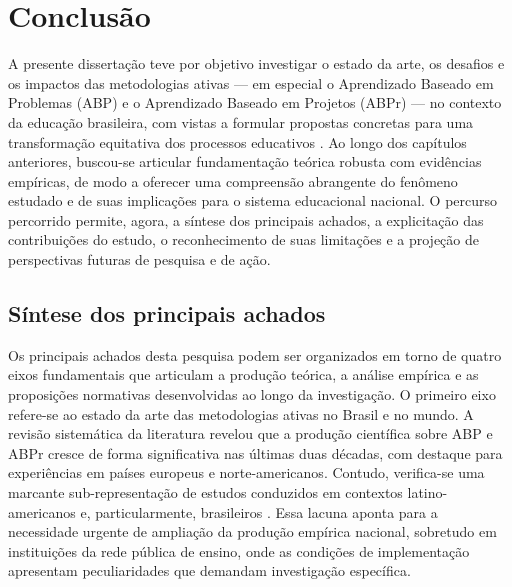
\chapter{Conclusão}
\label{chap:conclusao}

A presente dissertação teve por objetivo investigar o estado da arte, os desafios e os impactos das metodologias ativas — em especial o Aprendizado Baseado em Problemas (ABP) e o Aprendizado Baseado em Projetos (ABPr) — no contexto da educação brasileira, com vistas a formular propostas concretas para uma transformação equitativa dos processos educativos \cite{BACICH2018}. Ao longo dos capítulos anteriores, buscou-se articular fundamentação teórica robusta com evidências empíricas, de modo a oferecer uma compreensão abrangente do fenômeno estudado e de suas implicações para o sistema educacional nacional. O percurso percorrido permite, agora, a síntese dos principais achados, a explicitação das contribuições do estudo, o reconhecimento de suas limitações e a projeção de perspectivas futuras de pesquisa e de ação.

\section{Síntese dos principais achados}
\label{sec:sintese_achados}

Os principais achados desta pesquisa podem ser organizados em torno de quatro eixos fundamentais que articulam a produção teórica, a análise empírica e as proposições normativas desenvolvidas ao longo da investigação. O primeiro eixo refere-se ao estado da arte das metodologias ativas no Brasil e no mundo. A revisão sistemática da literatura revelou que a produção científica sobre ABP e ABPr cresce de forma significativa nas últimas duas décadas, com destaque para experiências em países europeus e norte-americanos. Contudo, verifica-se uma marcante sub-representação de estudos conduzidos em contextos latino-americanos e, particularmente, brasileiros \cite{VEIGA2014}. Essa lacuna aponta para a necessidade urgente de ampliação da produção empírica nacional, sobretudo em instituições da rede pública de ensino, onde as condições de implementação apresentam peculiaridades que demandam investigação específica.

